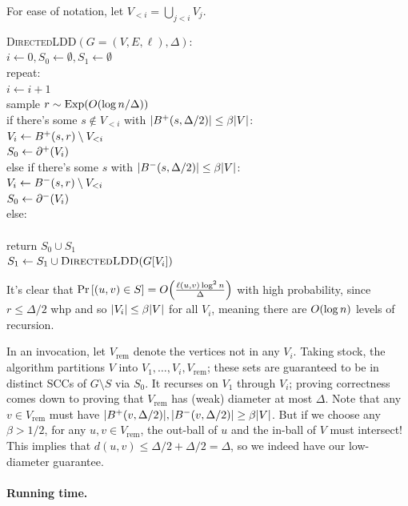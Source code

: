 \documentclass[12pt]{article}
\begin{document}
For ease of notation, let $V_{<i} = \bigcup_{j<i}V_j$.
\begin{centeralgo}
  \textsc{DirectedLDD}$(G = (V, E, \ell), \Delta)$:\+
  \\  $i \gets 0, S_0 \gets \emptyset, S_1 \gets \emptyset$
  \\  repeat:\+
  \\    $i \gets i + 1$
  \\    sample $r \sim \Exp{\bigO{\log n / \Delta}}$
  \\    if there's some $s \notin V_{<i}$ with $\sizeof{ \outball{s, \Delta/2} } \leq
  \beta\sizeof{V}$:\+
  \\      $V_i \gets \outball{s, r} \setminus V_{< i}$
  \\      $S_0 \gets \outcut{V_i}$\-
  \\    else if there's some $s$ with $\sizeof{ \inball{s, \Delta/2} } \leq
  \beta\sizeof{V}$:\+
  \\      $V_i \gets \inball{s, r} \setminus V_{< i}$
  \\      $S_0 \gets \incut{V_i}$\-
  \\  else:\+
  \\    
  \\    return $S_0 \cup S_1$\-
  \\  $S_1 \gets S_1 \cup \textsc{DirectedLDD}(G[V_i])$
\end{centeralgo}

It's clear that $\Pr{(u, v) \in S} = \bigO{\frac{\ell(u, v)\log^2 n}{\Delta}}$
with high probability, since $r \leq \Delta/2$ whp and so
$\sizeof{V_i} \leq \beta|V|$ for all $V_i$, meaning there are $\bigO{\log n}$
levels of recursion.

In an invocation, let $V_\text{rem}$ denote the vertices not in any $V_i$.
Taking stock, the algorithm partitions $V$ into $V_1, \dots, V_i, V_\text{rem}$;
these sets are guaranteed to be in distinct SCCs of $G \setminus S$ via $S_0$.
It recurses on $V_1$ through $V_i$; proving correctness comes down to proving
that $V_\text{rem}$ has (weak) diameter at most $\Delta$. Note that any
$v \in V_\text{rem}$ must have
$\sizeof{\outball{v, \Delta/2}}, \sizeof{\inball{v, \Delta/2}} \geq \beta\sizeof{V}$.
But if we choose any $\beta > 1/2$, for any $u, v \in V_\text{rem}$, the
out-ball of $u$ and the in-ball of $V$ must intersect! This implies that
$d(u, v) \leq \Delta/2 + \Delta/2 = \Delta$, so we indeed have our low-diameter
guarantee.

\paragraph{Running time.}
\end{document}
